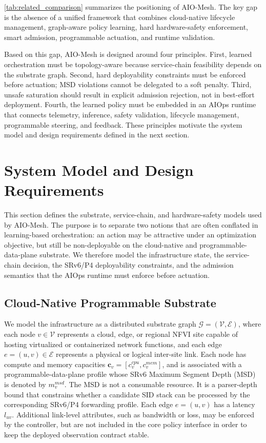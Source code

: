 \documentclass[final,5p]{elsarticle}
\begin{document}
\autoref{tab:related_comparison} summarizes the positioning of AIO-Mesh. The key gap is the absence of a unified framework that combines cloud-native lifecycle management, graph-aware policy learning, hard hardware-safety enforcement, smart admission, programmable actuation, and runtime validation.

Based on this gap, AIO-Mesh is designed around four principles. First, learned orchestration must be topology-aware because service-chain feasibility depends on the substrate graph. Second, hard deployability constraints must be enforced before actuation; MSD violations cannot be delegated to a soft penalty. Third, unsafe saturation should result in explicit admission rejection, not in best-effort deployment. Fourth, the learned policy must be embedded in an AIOps runtime that connects telemetry, inference, safety validation, lifecycle management, programmable steering, and feedback. These principles motivate the system model and design requirements defined in the next section.


\section{System Model and Design Requirements}
\label{sec:system_model}

This section defines the substrate, service-chain, and hardware-safety models used by AIO-Mesh. The purpose is to separate two notions that are often conflated in learning-based orchestration: an action may be attractive under an optimization objective, but still be non-deployable on the cloud-native and programmable-data-plane substrate. We therefore model the infrastructure state, the service-chain decision, the SRv6/P4 deployability constraints, and the admission semantics that the AIOps runtime must enforce before actuation.

\subsection{Cloud-Native Programmable Substrate}
\label{subsec:infrastructure_model}

We model the infrastructure as a distributed substrate graph $ \mathcal{G}=(\mathcal{V},\mathcal{E})$,
where each node \(v\in\mathcal{V}\) represents a cloud, edge, or regional NFVI site capable of hosting virtualized or containerized network functions, and each edge \(e=(u,v)\in\mathcal{E}\) represents a physical or logical inter-site link. Each node has compute and memory capacities $\mathbf{c}_v=\left[c_v^{cpu},c_v^{mem}\right]$,
and is associated with a programmable-data-plane profile whose SRv6 Maximum Segment Depth (MSD) is denoted by \(m_v^{msd}\). The MSD is not a consumable resource. It is a parser-depth bound that constrains whether a candidate SID stack can be processed by the corresponding SRv6/P4 forwarding profile. Each edge \(e=(u,v)\) has a latency \(l_{uv}\). Additional link-level attributes, such as bandwidth or loss, may be enforced by the controller, but are not included in the core policy interface in order to keep the deployed observation contract stable.
\end{document}
